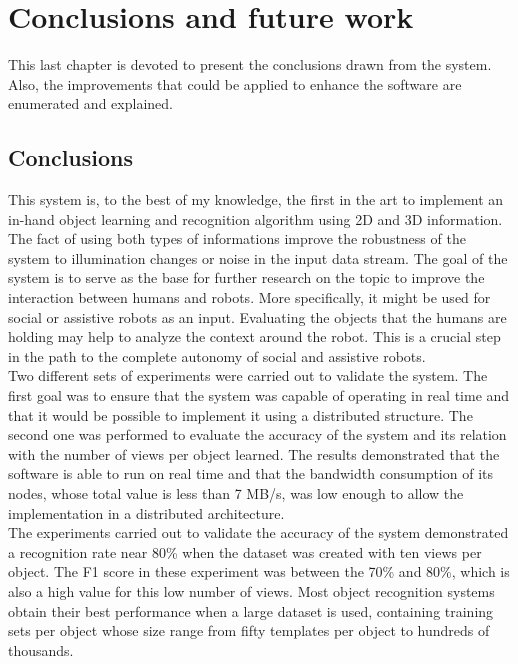 \chapter{Conclusions and future work}
\label{conclusions}

This last chapter is devoted to present the conclusions drawn from the system. 
Also, the improvements that could be applied to enhance the software are enumerated and explained. 

	\section{Conclusions}

	This system is, to the best of my knowledge, the first in the art to implement an in-hand object learning and recognition algorithm using 2D and 3D information.
	The fact of using both types of informations improve the robustness of the system to illumination changes or noise in the input data stream.  
	The goal of the system is to serve as the base for further research on the topic to improve the interaction between humans and robots. 
	More specifically, it might be used for social or assistive robots as an input. 
	Evaluating the objects that the humans are holding may help to analyze the context around the robot. 
	This is a crucial step in the path to the complete autonomy of social and assistive robots. 
	\\

	Two different sets of experiments were carried out to validate the system. 
	The first  goal was to ensure that the system was capable of operating in real time and that it would be possible to implement it using a distributed structure. 
	The second one was performed to evaluate the accuracy of the system and its relation with the number of views per object learned. 
	The results demonstrated that the software is able to run on real time and that the bandwidth consumption of its nodes, whose total value is less than 7 MB/s, was low enough to allow the implementation in a distributed architecture. 
	\\

	The experiments carried out to validate the accuracy of the system demonstrated a recognition rate near 80\% when the dataset was created with ten views per object. 
	The F1 score in these experiment was between the 70\% and 80\%, which is also a high value for this low number of views. 
	Most object recognition systems obtain their best performance when a large dataset is used, containing training sets per object whose size range from fifty templates per object to hundreds of thousands.
	\\

